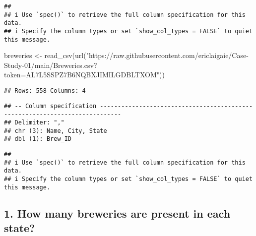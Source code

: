 \documentclass[
]{article}
\newenvironment{Shaded}{\begin{snugshade}}{\end{snugshade}}
\newcommand{\FunctionTok}[1]{\textcolor[rgb]{0.00,0.00,0.00}{#1}}
\newcommand{\NormalTok}[1]{#1}
\newcommand{\OtherTok}[1]{\textcolor[rgb]{0.56,0.35,0.01}{#1}}
\newcommand{\StringTok}[1]{\textcolor[rgb]{0.31,0.60,0.02}{#1}}
\begin{document}
\begin{verbatim}
## 
## i Use `spec()` to retrieve the full column specification for this data.
## i Specify the column types or set `show_col_types = FALSE` to quiet this message.
\end{verbatim}

\begin{Shaded}
\begin{Highlighting}[]
\NormalTok{breweries }\OtherTok{\textless{}{-}} \FunctionTok{read\_csv}\NormalTok{(}\FunctionTok{url}\NormalTok{(}\StringTok{"https://raw.githubusercontent.com/ericlaigaie/Case{-}Study{-}01/main/Breweries.csv?token=AL7L5SSPZ7B6NQBXJIMILGDBLTXOM"}\NormalTok{))}
\end{Highlighting}
\end{Shaded}

\begin{verbatim}
## Rows: 558 Columns: 4
\end{verbatim}

\begin{verbatim}
## -- Column specification ----------------------------------------------------------------------------
## Delimiter: ","
## chr (3): Name, City, State
## dbl (1): Brew_ID
\end{verbatim}

\begin{verbatim}
## 
## i Use `spec()` to retrieve the full column specification for this data.
## i Specify the column types or set `show_col_types = FALSE` to quiet this message.
\end{verbatim}

\hypertarget{how-many-breweries-are-present-in-each-state}{%
\subsection{1. How many breweries are present in each
state?}\label{how-many-breweries-are-present-in-each-state}}
\end{document}
